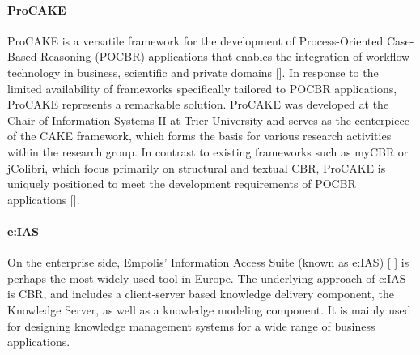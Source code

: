         
            \paragraph{ProCAKE}
            ProCAKE is a versatile framework for the development of Process-Oriented Case-Based Reasoning (POCBR) applications that enables the integration of workflow technology in business, scientific and private domains []. In response to the limited availability of frameworks specifically tailored to POCBR applications, ProCAKE represents a remarkable solution. ProCAKE was developed at the Chair of Information Systems II at Trier University and serves as the centerpiece of the CAKE framework, which forms the basis for various research activities within the research group. In contrast to existing frameworks such as myCBR or jColibri, which focus primarily on structural and textual CBR, ProCAKE is uniquely positioned to meet the development requirements of POCBR applications [].


            \paragraph{e:IAS}
            On the enterprise side, Empolis' Information Access Suite (known as e:IAS) [ ] is perhaps the most widely used tool in Europe. The underlying approach of e:IAS is CBR, and includes a client-server based knowledge delivery component, the Knowledge Server, as well as a knowledge modeling component. It is mainly used for designing knowledge management systems for a wide range of business applications.